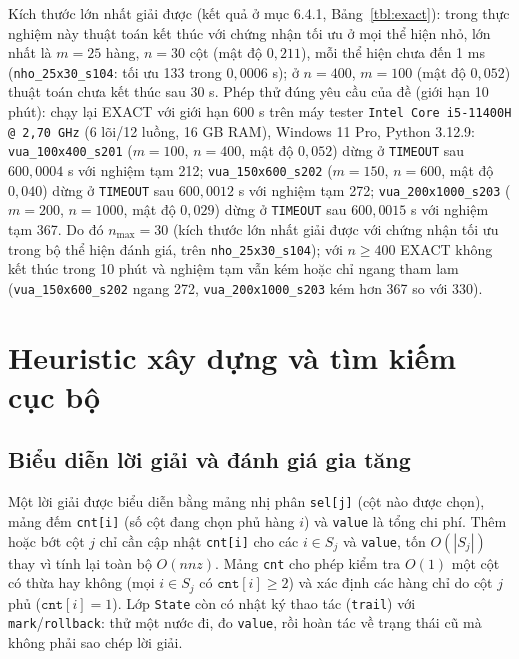 \documentclass[a4paper,12pt]{article}
\begin{document}
Kích thước lớn nhất giải được (kết quả ở mục 6.4.1, Bảng~\ref{tbl:exact}): trong thực nghiệm này thuật toán kết thúc với chứng nhận tối ưu ở mọi thể hiện nhỏ, lớn nhất là $m=25$ hàng, $n=30$ cột (mật độ $0{,}211$), mỗi thể hiện chưa đến 1 ms (\texttt{nho\_25x30\_s104}: tối ưu 133 trong $0{,}0006$ s); ở $n=400$, $m=100$ (mật độ $0{,}052$) thuật toán chưa kết thúc sau 30 s. Phép thử đúng yêu cầu của đề (giới hạn 10 phút): chạy lại EXACT với giới hạn 600 s trên máy tester \texttt{Intel Core i5-11400H @ 2,70 GHz} (6 lõi/12 luồng, 16 GB RAM), Windows 11 Pro, Python 3.12.9: \texttt{vua\_100x400\_s201} ($m=100$, $n=400$, mật độ $0{,}052$) dừng ở \texttt{TIMEOUT} sau $600{,}0004$ s với nghiệm tạm 212; \texttt{vua\_150x600\_s202} ($m=150$, $n=600$, mật độ $0{,}040$) dừng ở \texttt{TIMEOUT} sau $600{,}0012$ s với nghiệm tạm 272; \texttt{vua\_200x1000\_s203} ($m=200$, $n=1000$, mật độ $0{,}029$) dừng ở \texttt{TIMEOUT} sau $600{,}0015$ s với nghiệm tạm 367. Do đó $n_{\max}=30$ (kích thước lớn nhất giải được với chứng nhận tối ưu trong bộ thể hiện đánh giá, trên \texttt{nho\_25x30\_s104}); với $n\ge400$ EXACT không kết thúc trong 10 phút và nghiệm tạm vẫn kém hoặc chỉ ngang tham lam (\texttt{vua\_150x600\_s202} ngang 272, \texttt{vua\_200x1000\_s203} kém hơn 367 so với 330).

\section{Heuristic xây dựng và tìm kiếm cục bộ}
\subsection{Biểu diễn lời giải và đánh giá gia tăng}
Một lời giải được biểu diễn bằng mảng nhị phân \texttt{sel[j]} (cột nào được chọn), mảng đếm \texttt{cnt[i]} (số cột đang chọn phủ hàng $i$) và \texttt{value} là tổng chi phí. Thêm hoặc bớt cột $j$ chỉ cần cập nhật \texttt{cnt[i]} cho các $i\in S_j$ và \texttt{value}, tốn $O(|S_j|)$ thay vì tính lại toàn bộ $O(nnz)$. Mảng \texttt{cnt} cho phép kiểm tra $O(1)$ một cột có thừa hay không (mọi $i\in S_j$ có $\texttt{cnt}[i]\ge2$) và xác định các hàng chỉ do cột $j$ phủ ($\texttt{cnt}[i]=1$). Lớp \texttt{State} còn có nhật ký thao tác (\texttt{trail}) với \texttt{mark}/\texttt{rollback}: thử một nước đi, đo \texttt{value}, rồi hoàn tác về trạng thái cũ mà không phải sao chép lời giải.
\end{document}
